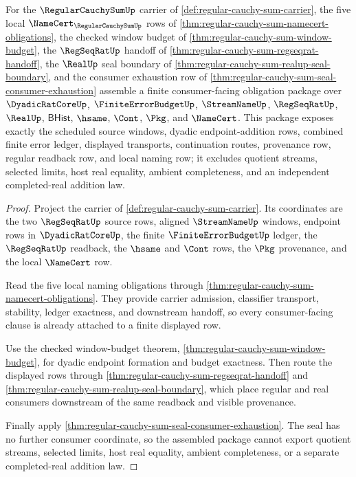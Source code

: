 \begin{theorem}
\label{thm:regular-cauchy-sum-consumer-obligation-package}
For the $\RegularCauchySumUp$ carrier of \autoref{def:regular-cauchy-sum-carrier}, the five local $\NameCert_{\RegularCauchySumUp}$ rows of \autoref{thm:regular-cauchy-sum-namecert-obligations}, the checked window budget of \autoref{thm:regular-cauchy-sum-window-budget}, the $\RegSeqRatUp$ handoff of \autoref{thm:regular-cauchy-sum-regseqrat-handoff}, the $\RealUp$ seal boundary of \autoref{thm:regular-cauchy-sum-realup-seal-boundary}, and the consumer exhaustion row of \autoref{thm:regular-cauchy-sum-seal-consumer-exhaustion} assemble a finite consumer-facing obligation package over $\DyadicRatCoreUp$, $\FiniteErrorBudgetUp$, $\StreamNameUp$, $\RegSeqRatUp$, $\RealUp$, $\mathsf{BHist}$, $\hsame$, $\Cont$, $\Pkg$, and $\NameCert$. This package exposes exactly the scheduled source windows, dyadic endpoint-addition rows, combined finite error ledger, displayed transports, continuation routes, provenance row, regular readback row, and local naming row; it excludes quotient streams, selected limits, host real equality, ambient completeness, and an independent completed-real addition law.
\end{theorem}
\begin{proof}
Project the carrier of \autoref{def:regular-cauchy-sum-carrier}. Its coordinates are the two $\RegSeqRatUp$ source rows, aligned $\StreamNameUp$ windows, endpoint rows in $\DyadicRatCoreUp$, the finite $\FiniteErrorBudgetUp$ ledger, the $\RegSeqRatUp$ readback, the $\hsame$ and $\Cont$ rows, the $\Pkg$ provenance, and the local $\NameCert$ row.

Read the five local naming obligations through \autoref{thm:regular-cauchy-sum-namecert-obligations}. They provide carrier admission, classifier transport, stability, ledger exactness, and downstream handoff, so every consumer-facing clause is already attached to a finite displayed row.

Use the checked window-budget theorem, \autoref{thm:regular-cauchy-sum-window-budget}, for dyadic endpoint formation and budget exactness. Then route the displayed rows through \autoref{thm:regular-cauchy-sum-regseqrat-handoff} and \autoref{thm:regular-cauchy-sum-realup-seal-boundary}, which place regular and real consumers downstream of the same readback and visible provenance.

Finally apply \autoref{thm:regular-cauchy-sum-seal-consumer-exhaustion}. The seal has no further consumer coordinate, so the assembled package cannot export quotient streams, selected limits, host real equality, ambient completeness, or a separate completed-real addition law.
\end{proof}

